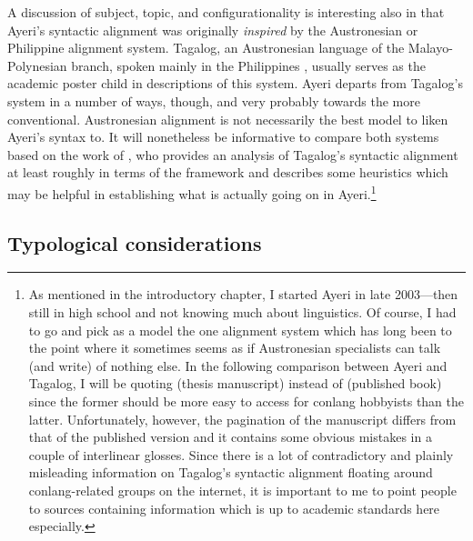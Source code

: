 A discussion of subject, topic, and configurationality is interesting also
in that Ayeri's syntactic alignment was originally \emph{inspired} by the
Austronesian or Philippine alignment system. Tagalog, an Austronesian language
of the Malayo-Polynesian branch, spoken mainly in the Philippines
\parencites{glottolog:tgl}{schachterotanes1972}, usually serves as the
academic poster child in descriptions of this system. Ayeri departs from
Tagalog's system in a number of ways, though, and very probably towards the
more conventional. Austronesian alignment is not necessarily the best model to
liken Ayeri's syntax to. It will nonetheless be informative to compare both
systems based on the work of \textcites{kroeger1991}{kroeger1993a}, who
provides an analysis of Tagalog's syntactic alignment at least roughly in terms
of the \Lfg{} framework and describes some heuristics which may be helpful in
establishing what is actually going on in Ayeri.\footnote{As mentioned in the
introductory chapter, I started Ayeri in late 2003---then still in high school
and not knowing much about linguistics. Of course, I had to go and pick as a
model the one alignment system which has long been  to the
point where it  {sometimes seems as if Austronesian
specialists can talk (and write) of nothing else}. In the following comparison
between Ayeri and Tagalog, I will be quoting \citet{kroeger1991} (thesis
manuscript) instead of \citet{kroeger1993b} (published book) since the former
should be more easy to access for conlang hobbyists than the latter.
Unfortunately, however, the pagination of the manuscript differs from that of
the published version and it contains some obvious mistakes in a couple of
interlinear glosses. Since there is a lot of contradictory and plainly
misleading information on Tagalog's syntactic alignment floating around
conlang-related groups on the internet, it is important to me to point people
to sources containing information which is up to academic standards here
especially.}

\subsection{Typological considerations}
\label{sec:verbtypo}

